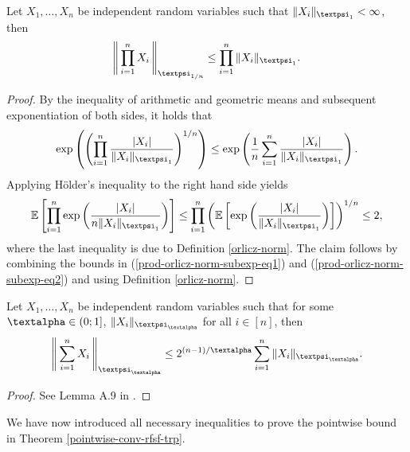 \documentclass[openany]{book}
\begin{document}
\begin{lemma}\label{prod-orlicz-norm-subexp}
    Let $X_1,\dots,X_n$ be independent random variables such that $\|X_i\|_{\gpsi_1}<\infty$, then
    \begin{equation*}
        \left\|\,\prod_{i=1}^nX_i\,\right\|_{\gpsi_{1/n}}\leq \prod_{i=1}^n\|X_i\|_{\gpsi_1}.
    \end{equation*}
    \begin{proof}
        By the inequality of arithmetic and geometric means and subsequent exponentiation of both sides, it holds that
        \begin{equation}\label{prod-orlicz-norm-subexp-eq1}
            \exp\left(\left(\prod_{i=1}^n\frac{\vert X_i\vert}{\|X_i\|_{\gpsi_1}}\right)^{1/n}\right)\leq \exp\left(\frac{1}{n}\sum_{i=1}^n\frac{\vert X_i\vert}{\|X_i\|_{\gpsi_1}}\right).
        \end{equation}
        Applying Hölder's inequality to the right hand side yields
        \begin{equation}\label{prod-orlicz-norm-subexp-eq2}
            \mathbb E\left[\prod_{i=1}^n\exp\left(\frac{\vert X_i\vert}{n\|X_i\|_{\gpsi_1}}\right)\right]\leq \prod_{i=1}^n\left(\mathbb E\left[\exp\left(\frac{\vert X_i\vert }{\|X_i\|_{\gpsi_1}}\right)\right]\right)^{1/n}\leq 2,
        \end{equation}
        where the last inequality is due to Definition \ref{orlicz-norm}. The claim follows by combining the bounds in (\ref{prod-orlicz-norm-subexp-eq1}) and (\ref{prod-orlicz-norm-subexp-eq2}) and using Definition \ref{orlicz-norm}.
    \end{proof}
\end{lemma}
\begin{lemma}\label{triangle-ineq-orlicz-norm}
    Let $X_1,\dots,X_n$ be independent random variables such that for some $\galpha \in (0;1]$, $\|X_i\|_{\gpsi_{\galpha}}$ for all $i\in [n]$, then
    \begin{equation*}
    \left\|\,\sum_{i=1}^nX_i\,\right\|_{\gpsi_{\galpha}}\leq2^{(n-1)/\galpha}\sum_{i=1}^n\|X_i\|_{\gpsi_{\galpha}}.
    \end{equation*}
    \begin{proof}
        See Lemma A.9 in \cite{toth2025}.
    \end{proof}
\end{lemma} 
We have now introduced all necessary inequalities to prove the pointwise bound in Theorem \ref{pointwise-conv-rfsf-trp}.
\end{document}
